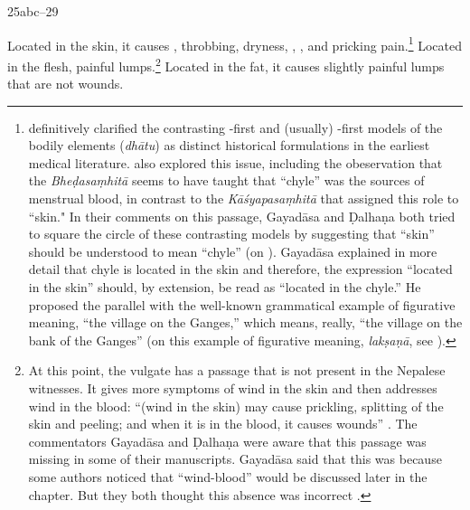 \begin{translation}
\item[25abc--29] 

Located in the skin, it causes ,
throbbing, dryness, , ,
and pricking pain.\footnote{\citet{maas-2008} definitively clarified
    the contrasting -first and (usually) -first models
    of the bodily elements (\emph{dhātu}) as
    distinct historical formulations in the earliest medical literature.
    \cite[267--282]{das-2003} also explored this issue, including the
    obeservation that the \emph{Bheḍasaṃhitā} seems to have taught that
     “chyle”  was the sources of menstrual blood, in contrast to
    the \emph{Kāśyapasaṃhitā} that assigned this role to 
    “skin." In their comments on this passage, Gayadāsa and Ḍalhaṇa both
    tried to square the circle of these contrasting models by suggesting
    that  “skin” should be understood to mean  “chyle”
    (on ). Gayadāsa explained in more detail that chyle is
    located in the skin and therefore, the expression 
    “located in the skin” should, by extension, be read as 
    “located in the chyle.”  He proposed the parallel with the well-known
    grammatical example of figurative meaning,  “the
    village on the Ganges,” which means, really, “the village on the bank
    of the Ganges” (on this example of figurative meaning, \emph{lakṣaṇā},
    see \cites[698--699]{jhal-1978}[ch.\,6]{kunj-1963}).  } Located in the
    flesh, painful lumps.\footnote{At this point, the vulgate has a
        passage that is not present in the Nepalese witnesses.  It gives more
        symptoms of wind in the skin and then addresses wind in the blood:
        “(wind in the skin) may cause prickling, splitting of the skin and
        peeling; and when it is in the blood, it causes wounds”
        \citep[261]{vulgate}. \label{ancient-variants}The commentators
        Gayadāsa and Ḍalhaṇa were aware that this passage was missing in some
        of their manuscripts. Gayadāsa said that this was because some authors
        noticed that  “wind-blood” would be discussed later in
        the chapter. But they both thought this absence was incorrect
        \citep[262]{vulgate}.} Located in the fat, it causes slightly painful
        lumps that are not wounds.
        

\end{translation}
